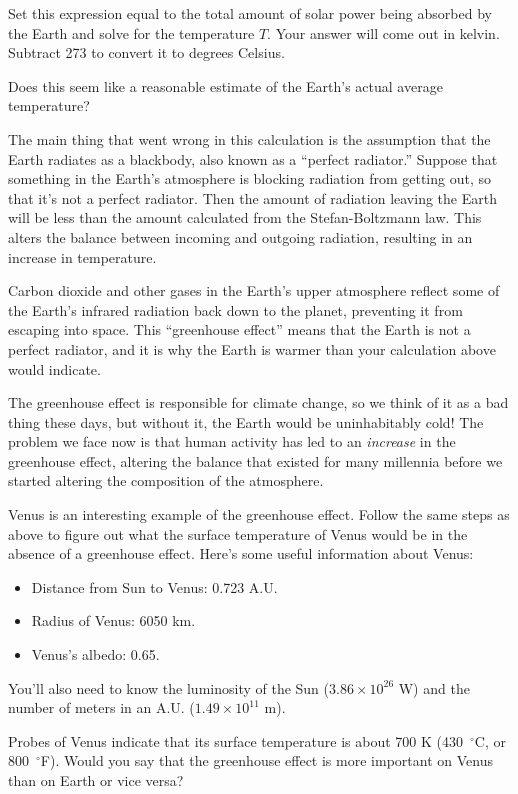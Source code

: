 Set this expression equal to the total amount of solar power
being absorbed by the Earth and solve for the temperature $T$.
Your answer will come out in kelvin.  Subtract 273 to convert 
it to degrees Celsius.

\answerspace{1.5in}

Does this seem like a reasonable estimate of the Earth's 
actual average temperature?

\answerspace{1in}

The main thing that went wrong in this calculation is the assumption
that the Earth radiates as a blackbody, also known
as a  ``perfect radiator.''
Suppose that something in the Earth's atmosphere is blocking
radiation from getting out, so that it's not a perfect radiator.
Then the amount of radiation leaving the Earth will be less than 
the amount calculated from the Stefan-Boltzmann law.  This
alters the balance between incoming and outgoing radiation, resulting
in an increase in temperature.

Carbon dioxide and other gases in the Earth's upper atmosphere reflect some of
the Earth's infrared radiation back down to the planet, preventing it from
escaping into space.  This ``greenhouse effect'' means that
the Earth is not a perfect radiator, and it is why
the Earth is warmer than your calculation above would indicate.

The greenhouse effect is responsible for climate change, so
we think of it as a bad thing these days,
but without it, the Earth would be uninhabitably cold!  The
problem we face now is that human activity has led to
an {\it increase} in the
greenhouse effect, altering the balance that existed for 
many millennia before we started altering the composition of the
atmosphere.

Venus is an interesting example of the greenhouse effect.
Follow the same steps as above to figure out what
the surface temperature of Venus would be in the absence of
a greenhouse effect.  Here's some useful information about Venus:

\begin{itemize}
\item Distance from Sun to Venus: 0.723 A.U.
\item Radius of Venus: 6050 km.
\item Venus's albedo: 0.65.
\end{itemize}

You'll also need to know the luminosity of the Sun ($3.86\times 10^{26}$ W)
and the number of meters in an A.U. ($1.49\times 10^{11}$ m).

\vfil

Probes of Venus indicate that its surface temperature is about 700 K
(430~$^\circ$C, or 800~$^\circ$F).  Would you say that the
greenhouse effect is more important on Venus than on Earth or 
vice versa?

\answerspace{1in}
\eject




